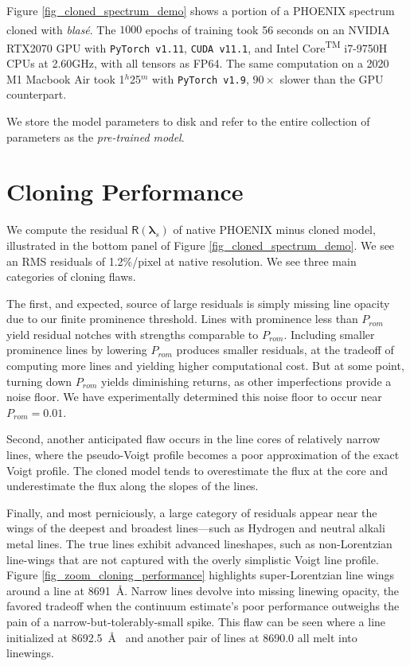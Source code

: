 \documentclass[modern]{aastex631}
\begin{document}
Figure \ref{fig_cloned_spectrum_demo} shows a portion of a PHOENIX spectrum cloned with \emph{blas\'e}. The $1000$ epochs of training took 56 seconds on an NVIDIA\textsuperscript{\tiny\textregistered} RTX2070 GPU with \texttt{PyTorch v1.11}, \texttt{CUDA v11.1}, and Intel\textsuperscript{\tiny\textregistered} Core\textsuperscript{\tiny TM} i7-9750H CPUs at 2.60GHz, with all tensors as FP64. The same computation on a 2020 M1 Macbook Air took 1$^h$25$^m$ with \texttt{PyTorch v1.9}, $90\times$ slower than the GPU counterpart.

We store the model parameters to disk and refer to the entire collection of parameters as the \emph{pre-trained model}.

\section{Cloning Performance}

We compute the residual $\mathsf{R}(\bm{\lambda}_s)$ of native PHOENIX minus cloned model, illustrated in the bottom panel of Figure \ref{fig_cloned_spectrum_demo}. We see an RMS residuals of 1.2\%/pixel at native resolution. We see three main categories of cloning flaws.

The first, and expected, source of large residuals is simply missing line opacity due to our finite prominence threshold. Lines with prominence less than $P_{rom}$ yield residual notches with strengths comparable to $P_{rom}$. Including smaller prominence lines by lowering $P_{rom}$ produces smaller residuals, at the tradeoff of computing more lines and yielding higher computational cost.  But at some point, turning down $P_{rom}$ yields diminishing returns, as other imperfections provide a noise floor.  We have experimentally determined this noise floor to occur near $P_{rom}=0.01$.

Second, another anticipated flaw occurs in the line cores of relatively narrow lines, where the pseudo-Voigt profile becomes a poor approximation of the exact Voigt profile.  The cloned model tends to overestimate the flux at the core and underestimate the flux along the slopes of the lines.

Finally, and most perniciously, a large category of residuals appear near the wings of the deepest and broadest lines---such as Hydrogen and neutral alkali metal lines.  The true lines exhibit advanced lineshapes, such as non-Lorentzian line-wings that are not captured with the overly simplistic Voigt line profile.  Figure \ref{fig_zoom_cloning_performance} highlights super-Lorentzian line wings around a line at 8691~\AA.  Narrow lines devolve into missing linewing opacity, the favored tradeoff when the continuum estimate's poor performance outweighs the pain of a narrow-but-tolerably-small spike. This flaw can be seen  where a line initialized at 8692.5~\AA~ and another pair of lines at 8690.0 all melt into linewings.
\end{document}
